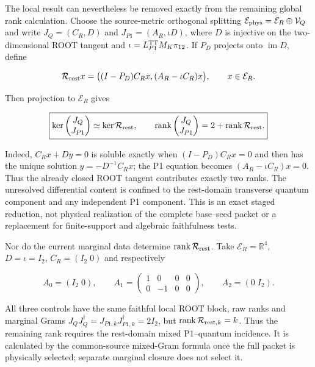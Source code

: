\documentclass[11pt]{article}
\begin{document}
The local result can nevertheless be removed exactly from the remaining
global rank calculation.  Choose the source-metric orthogonal splitting
$\mathcal E_{\rm phys}=\mathcal E_R\oplus\mathcal V_Q$ and write
$J_Q=(C_R,D)$ and $J_{P1}=(A_R,\iota D)$, where $D$ is injective on the
two-dimensional ROOT tangent and $\iota=L_{P1}^{\rm TT}M_K\pi_{12}$.
If $P_D$ projects onto $\operatorname{im}D$, define

\begin{equation}
\mathcal R_{\rm rest}x
=\bigl((I-P_D)C_Rx,(A_R-\iota C_R)x\bigr),
\qquad x\in\mathcal E_R.
\label{eq:stagedglue}
\end{equation}

Then projection to $\mathcal E_R$ gives

\begin{equation}
\boxed{
\ker\begin{pmatrix}J_Q\\J_{P1}\end{pmatrix}
\simeq\ker\mathcal R_{\rm rest},
\qquad
\operatorname{rank}\begin{pmatrix}J_Q\\J_{P1}\end{pmatrix}
=2+\operatorname{rank}\mathcal R_{\rm rest}.}
\label{eq:stagedgluerank}
\end{equation}

Indeed, $C_Rx+Dy=0$ is soluble exactly when
$(I-P_D)C_Rx=0$ and then has the unique solution
$y=-D^{-1}C_Rx$; the P1 equation becomes
$(A_R-\iota C_R)x=0$.  Thus the already closed ROOT tangent contributes
exactly two ranks.  The unresolved differential content is confined to the
rest-domain transverse quantum component and any independent P1 component.
This is an exact staged reduction, not physical realization of the complete
base--seed packet or a replacement for finite-support and algebraic
faithfulness tests.

Nor do the current marginal data determine
$\operatorname{rank}\mathcal R_{\rm rest}$. Take
$\mathcal E_R=\mathbb R^4$, $D=\iota=I_2$,
$C_R=(I_2\;0)$ and respectively

\begin{equation}
A_0=(I_2\;0),\qquad
A_1=\begin{pmatrix}1&0&0&0\\0&-1&0&0\end{pmatrix},\qquad
A_2=(0\;I_2).
\label{eq:restcontrols}
\end{equation}

All three controls have the same faithful local ROOT block, raw ranks and
marginal Grams $J_QJ_Q^\dagger=J_{P1,k}J_{P1,k}^\dagger=2I_2$, but
$\operatorname{rank}\mathcal R_{{\rm rest},k}=k$. Thus the remaining rank
requires the rest-domain mixed P1--quantum incidence. It is calculated by
the common-source mixed-Gram formula once the full packet is physically
selected; separate marginal closure does not select it.
\end{document}
